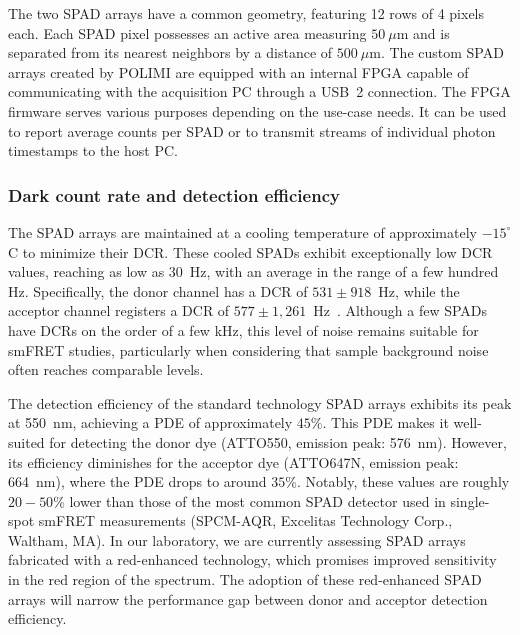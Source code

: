 The two \ac{SPAD} arrays have a common geometry, featuring 12 rows of 4 pixels each. 
Each \ac{SPAD} pixel possesses an active area measuring $50~\mu$m and is separated from its nearest neighbors by a distance of $500~\mu$m. 
The custom \ac{SPAD} arrays created by \ac{POLIMI} are equipped with an internal \ac{FPGA} capable of communicating with the acquisition PC through a USB~2 connection. 
The \ac{FPGA} firmware serves various purposes depending on the use-case needs.
It can be used to report average counts per \ac{SPAD} or to transmit streams of individual photon timestamps to the host PC.

\subsubsection{Dark count rate and detection efficiency}

The \ac{SPAD} arrays are maintained at a cooling temperature of approximately $-15^{\circ}$C to minimize their \ac{DCR}.
These cooled \ac{SPAD}s exhibit exceptionally low \ac{DCR} values, reaching as low as 30~Hz, with an average in the range of a few hundred Hz. 
Specifically, the donor channel has a \ac{DCR} of $531\pm918$~Hz, while the acceptor channel registers a \ac{DCR} of $577\pm1,261$~Hz~\cite{ingargiola_JCP_2018}. 
Although a few \ac{SPAD}s have \ac{DCR}s on the order of a few kHz, this level of noise remains suitable for \ac{smFRET} studies, particularly when considering that sample background noise often reaches comparable levels.

The detection efficiency of the standard technology \ac{SPAD} arrays exhibits its peak at 550~nm, achieving a \ac{PDE} of approximately $45\%$. 
This \ac{PDE} makes it well-suited for detecting the donor dye (ATTO550, emission peak: 576~nm). 
However, its efficiency diminishes for the acceptor dye (ATTO647N, emission peak: 664~nm), where the \ac{PDE} drops to around $35\%$\cite{gulinatti_SPIE_2012, gulinatti_SPIE_2013, michalet_JSTQE_2014}. 
Notably, these values are roughly $20 - 50\%$ lower than those of the most common \ac{SPAD} detector used in single-spot \ac{smFRET} measurements (SPCM-AQR, Excelitas Technology Corp., Waltham, MA)\cite{michalet_PRSB_2013}. 
In our laboratory, we are currently assessing \ac{SPAD} arrays fabricated with a red-enhanced technology, which promises improved sensitivity in the red region of the spectrum\cite{panzeri_SPIE_2013, ceccarelli_IEEEPTL_2018}. 
The adoption of these red-enhanced \ac{SPAD} arrays will narrow the performance gap between donor and acceptor detection efficiency.

